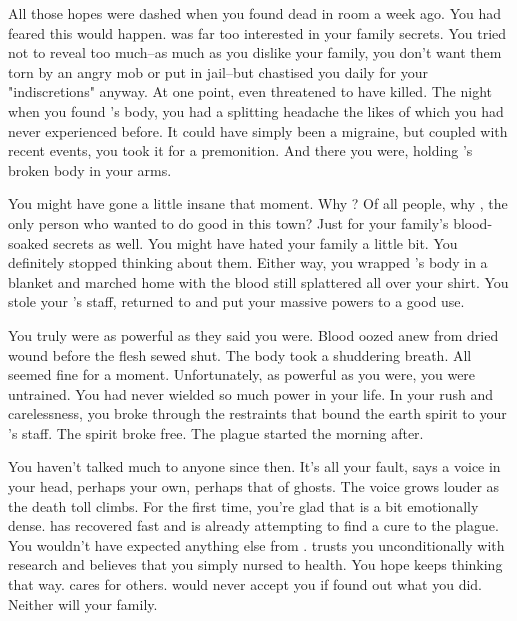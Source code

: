 \documentclass[char]{Pestilence}
\begin{document}
All those hopes were dashed when you found \cOutsider{} dead in \cOutsider{\their} room a week ago. You had feared this would happen. \cOutsider{} was far too interested in your family secrets. You tried not to reveal too much--as much as you dislike your family, you don't want them torn by an angry mob or put in jail--but \cApprentice{} chastised you daily for your "indiscretions" anyway. At one point, \cApprentice{\they} even threatened to have \cOutsider{} killed. The night when you found \cOutsider{}'s body, you had a splitting headache the likes of which you had never experienced before. It could have simply been a migraine, but coupled with recent events, you took it for a premonition. And there you were, holding \cOutsider{}'s broken body in your arms.

You might have gone a little insane that moment. Why \cOutsider{\them}? Of all people, why \cOutsider{}, the only person who wanted to do good in this town? Just for your family's blood-soaked secrets as well. You might have hated your family a little bit. You definitely stopped thinking about them. Either way, you wrapped \cOutsider{}'s body in a blanket and marched home with the blood still splattered all over your shirt. You stole your \cElder{\parent}'s staff, returned to \cOutsider{} and put your massive powers to a good use.

You truly were as powerful as they said you were. Blood oozed anew from dried wound before the flesh sewed shut. The body took a shuddering breath. All seemed fine for a moment. Unfortunately, as powerful as you were, you were untrained. You had never wielded so much power in your life. In your rush and carelessness, you broke through the restraints that bound the earth spirit to your \cElder{\parent}'s staff. The spirit broke free. The plague started the morning after.

You haven't talked much to anyone since then. It's all your fault, says a voice in your head, perhaps your own, perhaps that of ghosts. The voice grows louder as the death toll climbs. For the first time, you're glad that \cOutsider{} is a bit emotionally dense. \cOutsider{\They} has recovered fast and is already attempting to find a cure to the plague. You wouldn't have expected anything else from \cOutsider{\them}. \cOutsider{\They} trusts you unconditionally with \cOutsider{\their} research and believes that you simply nursed \cOutsider{\them} to health. You hope \cOutsider{\they} keeps thinking that way. \cOutsider{} cares for others. \cOutsider{\They} would never accept you if \cOutsider{\they} found out what you did. Neither will your family.
\end{document}
